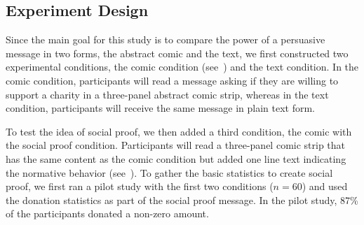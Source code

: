 

\subsection{Experiment Design}
\label{sub:Experiment Design}
Since the main goal for this study is to compare the power of a persuasive message in two forms, the abstract comic and the text, we first constructed two experimental conditions, the comic condition (see~) and the text condition. In the comic condition, participants will read a message asking if they are willing to support a charity in a three-panel abstract comic strip, whereas in the text condition, participants will receive the same message in plain text form. 

To test the idea of social proof, we then added a third condition, the comic with the social proof condition. Participants will read a three-panel comic strip that has the same content as the comic condition but added one line text indicating the normative behavior (see~). To gather the basic statistics to create social proof, we first ran a pilot study with the first two conditions ($n=60$) and used the donation statistics as part of the social proof message. In the pilot study, 87\% of the participants donated a non-zero amount. 

